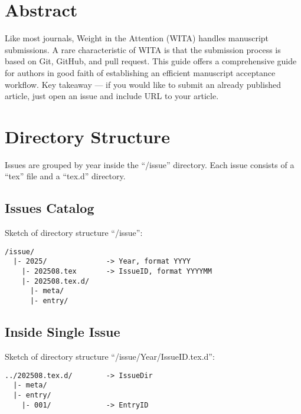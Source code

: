 


\providecommand{\showcmd}[0]{}
\providecommand{\showcmdparam}[0]{}
\renewcommand{\showcmd}[1]{\strut{\textbackslash#1}}
\renewcommand{\showcmdparam}[1]{\strut\textbraceleft{#1}\textbraceright}





\section*{Abstract}
Like most journals, Weight in the Attention (WITA) handles manuscript submissions.
A rare characteristic of WITA is that the submission process is based on Git, GitHub, and pull request.
This guide offers a comprehensive guide for authors in good faith of establishing an efficient manuscript acceptance workflow.
Key takeaway --- if you would like to submit an already published article, just open an issue and include URL to your article.



\section{Directory Structure}
Issues are grouped by year inside the ``/issue'' directory.
Each issue consists of a ``tex'' file and a ``tex.d'' directory.


\subsection{Issues Catalog}
Sketch of directory structure ``/issue'':

\begin{lstlisting}
/issue/
  |- 2025/              -> Year, format YYYY
    |- 202508.tex       -> IssueID, format YYYYMM
    |- 202508.tex.d/
      |- meta/
      |- entry/
\end{lstlisting}


\subsection{Inside Single Issue}
Sketch of directory structure ``/issue/Year/IssueID.tex.d'':

\begin{lstlisting}
../202508.tex.d/        -> IssueDir
  |- meta/
  |- entry/
    |- 001/             -> EntryID
\end{lstlisting}


